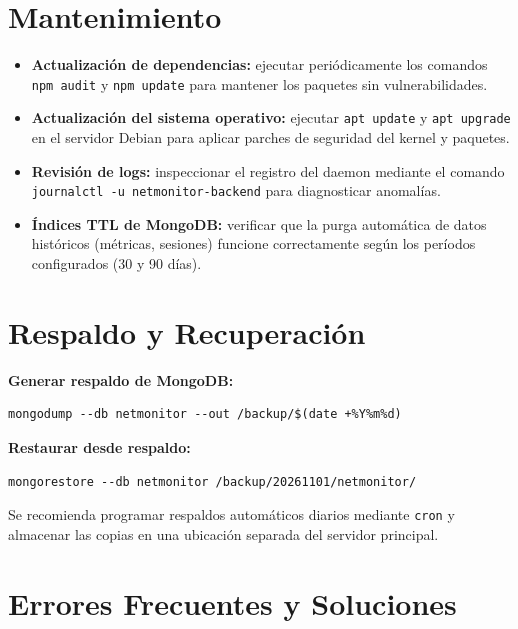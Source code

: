 \documentclass[12pt,a4paper]{report}
\begin{document}
\section{Mantenimiento}

\begin{itemize}
  \item \textbf{Actualización de dependencias:} ejecutar periódicamente los comandos \texttt{npm audit} y \texttt{npm update} para mantener los paquetes sin vulnerabilidades.
  \item \textbf{Actualización del sistema operativo:} ejecutar \texttt{apt update} y \texttt{apt upgrade} en el servidor Debian para aplicar parches de seguridad del kernel y paquetes.
  \item \textbf{Revisión de logs:} inspeccionar el registro del daemon mediante el comando \newline\texttt{journalctl -u netmonitor-backend} para diagnosticar anomalías.
  \item \textbf{Índices TTL de MongoDB:} verificar que la purga automática de datos históricos (métricas, sesiones) funcione correctamente según los períodos configurados (30 y 90 días).
\end{itemize}

\section{Respaldo y Recuperación}

\textbf{Generar respaldo de MongoDB:}
\begin{lstlisting}
mongodump --db netmonitor --out /backup/$(date +%Y%m%d)
\end{lstlisting}

\textbf{Restaurar desde respaldo:}
\begin{lstlisting}
mongorestore --db netmonitor /backup/20261101/netmonitor/
\end{lstlisting}

Se recomienda programar respaldos automáticos diarios mediante \texttt{cron} y almacenar las copias en una ubicación separada del servidor principal.

\section{Errores Frecuentes y Soluciones}
\end{document}
